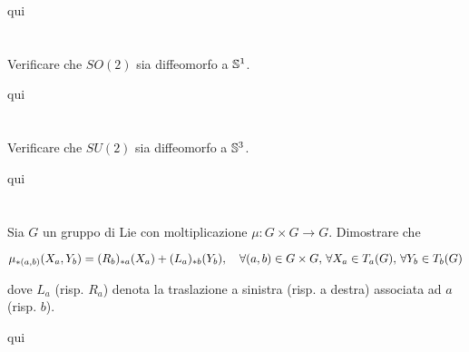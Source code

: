 qui

%

\newpage

%

\section{}\label{BONUS3-1}

\begin{tcolorbox}
	Verificare che $ SO(2) $ sia diffeomorfo a $ \S^{1} $.
\end{tcolorbox}

qui

%

\newpage

%

\section{}\label{BONUS3-2}

\begin{tcolorbox}
	Verificare che $ SU(2) $ sia diffeomorfo a $ \S^{3} $.
\end{tcolorbox}

qui

%

\newpage

%

\section{}\label{es3-7}

\begin{tcolorbox}
	Sia $ G $ un gruppo di Lie con moltiplicazione $ \mu : G \times G \to G $. Dimostrare che
	
	\begin{equation}
		\mu_{*(a,b)}(X_{a},Y_{b}) = (R_{b})_{*a}(X_{a}) + (L_{a})_{*b}(Y_{b}) \qcomma \forall (a,b) \in G \times G, \, \forall X_{a} \in T_{a}(G), \, \forall Y_{b} \in T_{b}(G)
	\end{equation}
	
	dove $ L_{a} $ (risp. $ R_{a} $) denota la traslazione a sinistra (risp. a destra) associata ad $ a $ (risp. $ b $).
\end{tcolorbox}

qui

%

\newpage

%

\section{}\label{es3-8}

